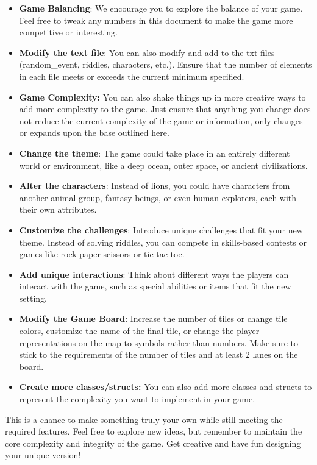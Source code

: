 \begin{itemize}
    \item \textbf{Game Balancing}: We encourage you to explore the balance of your game. Feel free to tweak any numbers in this document to make the game more competitive or interesting. 
    \item \textbf{Modify the text file}: You can also modify and add to the txt files (random\_event, riddles, characters, etc.). Ensure that the number of elements in each file meets or exceeds the current minimum specified.
    \item \textbf{Game Complexity:} You can also shake things up in more creative ways to add more complexity to the game. Just ensure that anything you change does not reduce the current complexity of the game or information, only changes or expands upon the base outlined here.
    \item \textbf{Change the theme}: The game could take place in an entirely different world or environment, like a deep ocean, outer space, or ancient civilizations.
    \item \textbf{Alter the characters}: Instead of lions, you could have characters from another animal group, fantasy beings, or even human explorers, each with their own attributes.
    \item \textbf{Customize the challenges}: Introduce unique challenges that fit your new theme. Instead of solving riddles, you can compete in skills-based contests or games like rock-paper-scissors or tic-tac-toe.
    \item \textbf{Add unique interactions}: Think about different ways the players can interact with the game, such as special abilities or items that fit the new setting.
    \item \textbf{Modify the Game Board}: Increase the number of tiles or change tile colors, customize the name of the final tile, or change the player representations on the map to symbols rather than numbers. Make sure to stick to the requirements of the number of tiles and at least 2 lanes on the board.
    \item \textbf{Create more classes/structs:} You can also add more classes and structs to represent the complexity you want to implement in your game.
\end{itemize}

This is a chance to make something truly your own while still meeting the required features. Feel free to explore new ideas, but remember to maintain the core complexity and integrity of the game. Get creative and have fun designing your unique version! 

